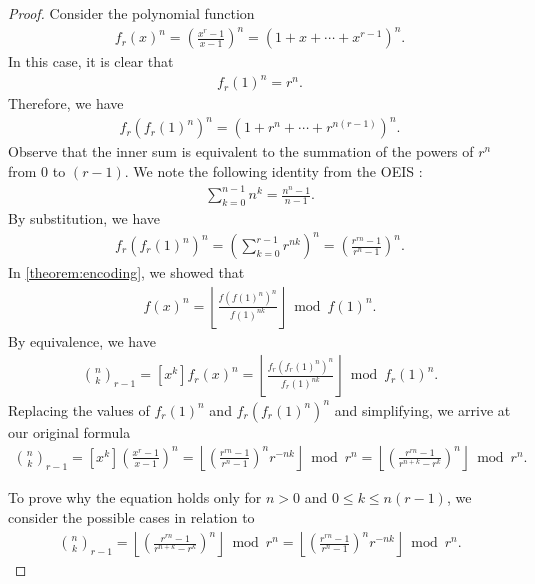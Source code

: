 \documentclass{article}
\theoremstyle{plain}
\begin{document}
\begin{proof}
Consider the polynomial function
\begin{align*}
    f_r(x)^n = \left(\frac{x^{r}-1}{x-1}\right)^n = (1 + x + \cdots + x^{r-1})^n .
\end{align*}
In this case, it is clear that
\begin{align*}
    f_r(1)^n = r^n .
\end{align*}
Therefore, we have
\begin{align*}
    f_r(f_r(1)^n)^n = (1 + r^n + \cdots + r^{n (r - 1)})^n .
\end{align*}
Observe that the inner sum is equivalent to the summation of the powers of $r^n$ from $0$ to $(r - 1)$. We note the following identity from the OEIS \cite{A023037}:
\begin{align*}
    \sum_{k=0}^{n-1} n^k = \frac{n^{n} - 1}{n - 1} .
\end{align*}
By substitution, we have
\begin{align*}
    f_r(f_r(1)^n)^n = \left(\sum_{k=0}^{r-1} r^{nk}\right)^n = \left(\frac{r^{rn} - 1}{r^{n} - 1}\right)^n .
\end{align*}
In \cref{theorem:encoding}, we showed that
\begin{align*}
    [x^k] f(x)^{n} = \left\lfloor\frac{f(f(1)^n)^{n}}{f(1)^{n k}}\right\rfloor \bmod{f(1)^{n}} .
\end{align*}
By equivalence, we have
\begin{align*}
    \binom{n}{k}_{r-1} = [x^k] f_r(x)^{n} = \left\lfloor\frac{f_r(f_r(1)^n)^{n}}{f_r(1)^{n k}}\right\rfloor \bmod{f_r(1)^{n}} .
\end{align*}
Replacing the values of $f_r(1)^n$ and $f_r(f_r(1)^n)^n$ and simplifying, we arrive at our original formula
\begin{align*}
    \binom{n}{k}_{r-1} = [x^k] \left(\frac{x^{r}-1}{x-1}\right)^n
    = \left\lfloor \left(\frac{r^{rn} - 1}{r^{n} - 1}\right)^n r^{-n k}\right\rfloor \bmod r^n
    = \left\lfloor \left(\frac{r^{rn} - 1}{r^{n+k} - r^k}\right)^n\right\rfloor \bmod r^n .
\end{align*}

To prove why the equation holds only for $n > 0$ and $0 \leq k \leq n (r-1)$, we consider the possible cases in relation to
\begin{align*}
    \binom{n}{k}_{r-1} = \left\lfloor \left(\frac{r^{rn} - 1}{r^{n+k} - r^k}\right)^n\right\rfloor \bmod r^n
    = \left\lfloor \left(\frac{r^{rn} - 1}{r^{n} - 1}\right)^n r^{-n k}\right\rfloor \bmod r^n .
\end{align*}


\end{proof}
\end{document}
